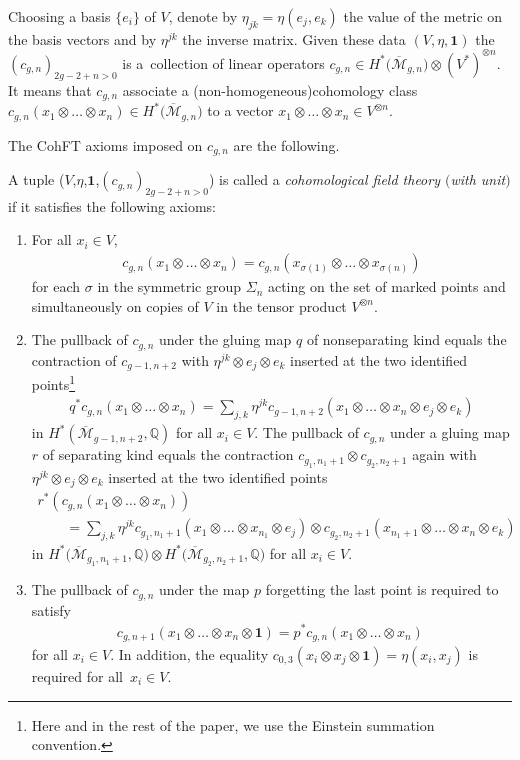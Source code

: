 \documentclass[pdftex]{sigma}
\def\oM{\overline{\mathcal{M}}}
\def\b1{{\mathbf 1}}
\numberwithin{equation}{section}
\begin{document}
Choosing a basis $\{e_i\}$ of $V$, denote by $\eta_{jk}=\eta(e_j,e_k)$ the value of the metric on the basis vectors and by $\eta^{jk}$ the inverse matrix.
Given these data $(V,\eta,\b1)$ the $(c_{g,n})_{2g-2+n > 0}$ is a~collection of linear operators
$c_{g,n} \in H^*\big(\oM_{g,n}\big) \otimes (V^*)^{\otimes n}$.
It means that $c_{g,n}$ associate a (non-homogeneous)cohomology class $c_{g,n}(x_1\otimes \dots \otimes x_n)\! \in H^*\big(\oM_{g,n}\big)$ to a vector
$x_1\otimes \dots \otimes x_n \in V^{\otimes n}$.

The CohFT axioms imposed on $c_{g,n}$ are the following.

\begin{Definition}\label{defcohft}
A tuple ($V$,$\eta$,$\b1$,$(c_{g,n})_{2g-2+n>0}$) is called a {\em cohomological field theory $($with unit$)$} if it satisfies the following axioms:
\begin{enumerate}\itemsep=0pt
\item[(i)] For all $x_i \in V$,
\begin{align*}
c_{g,n}(x_1\otimes \dots \otimes x_n) = c_{g,n}(x_{\sigma(1)}\otimes \dots \otimes x_{\sigma(n)})
\end{align*}
for each $\sigma$ in the symmetric group $\Sigma_n$ acting on the set of marked points and simultaneously on
copies of $V$ in the tensor product $V^{\otimes n}$.
\item[(ii)] The pullback of $c_{g,n}$ under the gluing map $q$ of nonseparating kind equals the contraction of $c_{g-1,n+2}$ with
$\eta^{jk}\otimes e_j \otimes e_k$ inserted at the two identified points\footnote{Here and in the rest of the paper, we use the Einstein summation convention.}
\begin{align*}
q^*c_{g,n}(x_1\otimes \dots \otimes x_n) =
\sum_{j,k} \eta^{jk} c_{g-1,n+2}(x_1\otimes \dots \otimes x_n \otimes e_j \otimes e_k)
\end{align*}
in $H^*(\oM_{g-1,n+2},\mathbb{Q})$ for all $x_i \in V$.
The pullback of $c_{g,n}$ under a gluing map $r$ of separating kind equals the contraction $c_{g_1, n_1+1} \otimes c_{g_2, n_2+1}$ again with $\eta^{jk}\otimes e_j \otimes e_k$ inserted at the two identified points
\begin{gather*}
r^*(c_{g,n}(x_1\otimes \dots \otimes x_n)) \\
\qquad=\sum_{j,k} \eta^{jk} c_{g_1,n_1+1}(x_1\otimes \dots \otimes x_{n_1}\otimes e_j) \otimes
c_{g_2,n_2+1}(x_{n_1+1}\otimes \dots \otimes x_n \otimes e_k)
\end{gather*}
in $H^*\big(\oM_{g_1,{n_1+1}},\mathbb{Q}\big) \otimes
H^*\big(\oM_{g_2,{n_2+1}},\mathbb{Q}\big)$ for all $x_i \in V$.

\item[(iii)]The pullback of $c_{g,n}$ under the map $p$ forgetting the last point is required to satisfy
\begin{align*}
c_{g,n+1}(x_1\otimes \dots \otimes x_n \otimes \b1) = p^*c_{g,n} (x_1\otimes \dots \otimes x_n)\
\end{align*}
for all $x_i \in V$.
In addition, the equality
$
c_{0,3}(x_i\otimes x_j\otimes \b1) = \eta(x_i,x_j)
$
is required for all~${x_i \in V}$.
\end{enumerate}
\end{Definition}
\end{document}
